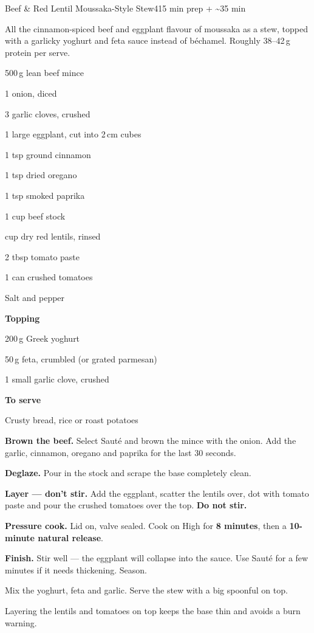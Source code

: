 \begin{recipebox}{Beef \& Red Lentil Moussaka-Style Stew}{4}{15 min prep + \textasciitilde35 min}

All the cinnamon-spiced beef and eggplant flavour of moussaka as a stew, topped
with a garlicky yoghurt and feta sauce instead of béchamel. Roughly 38--42\,g
protein per serve.

\begin{ingredients}
  \item 500\,g lean beef mince
  \item 1 onion, diced
  \item 3 garlic cloves, crushed
  \item 1 large eggplant, cut into 2\,cm cubes
  \item 1 tsp ground cinnamon
  \item 1 tsp dried oregano
  \item 1 tsp smoked paprika
  \item 1 cup beef stock
  \item {} cup dry red lentils, rinsed
  \item 2 tbsp tomato paste
  \item 1 can crushed tomatoes
  \item Salt and pepper
  \item[] \textbf{Topping}
  \item 200\,g Greek yoghurt
  \item 50\,g feta, crumbled (or grated parmesan)
  \item 1 small garlic clove, crushed
  \item[] \textbf{To serve}
  \item Crusty bread, rice or roast potatoes
\end{ingredients}

\begin{method}
  \item \textbf{Brown the beef.} Select Saut\'e and brown the mince with the onion. Add the garlic, cinnamon, oregano and paprika for the last 30 seconds.
  \item \textbf{Deglaze.} Pour in the stock and scrape the base completely clean.
  \item \textbf{Layer --- don't stir.} Add the eggplant, scatter the lentils over, dot with tomato paste and pour the crushed tomatoes over the top. \textbf{Do not stir.}
  \item \textbf{Pressure cook.} Lid on, valve sealed. Cook on High for \textbf{8 minutes}, then a \textbf{10-minute natural release}.
  \item \textbf{Finish.} Stir well --- the eggplant will collapse into the sauce. Use Saut\'e for a few minutes if it needs thickening. Season.
  \item Mix the yoghurt, feta and garlic. Serve the stew with a big spoonful on top.
\end{method}

\begin{notelist}
  \item Layering the lentils and tomatoes on top keeps the base thin and avoids a burn warning.
\end{notelist}

\end{recipebox}
